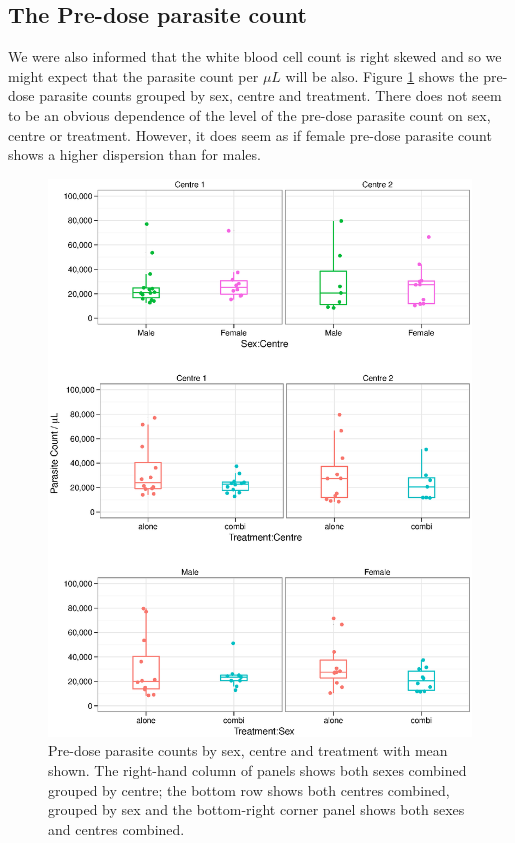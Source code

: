 \subsection{The Pre-dose parasite count}
We were also informed that the white blood cell count is right skewed and so we might expect that the parasite count per $\mu L$ will be also.
Figure \ref{preaov} shows the pre-dose parasite counts grouped by sex, centre and treatment. There does not seem to be an obvious dependence of the level of the pre-dose parasite count on sex, centre or treatment. However, it does seem as if female pre-dose parasite count shows a higher dispersion than for males.
\begin{figure}[h]
\begin{center}
\includegraphics[width=6.1in]{preaov.eps}
\caption{Pre-dose parasite counts by sex, centre and treatment with mean shown. The right-hand column of panels shows both sexes combined grouped by centre; the bottom row shows both centres combined, grouped by sex and the bottom-right corner panel shows both sexes and centres combined.}
\label{preaov}
\end{center}
\end{figure}

